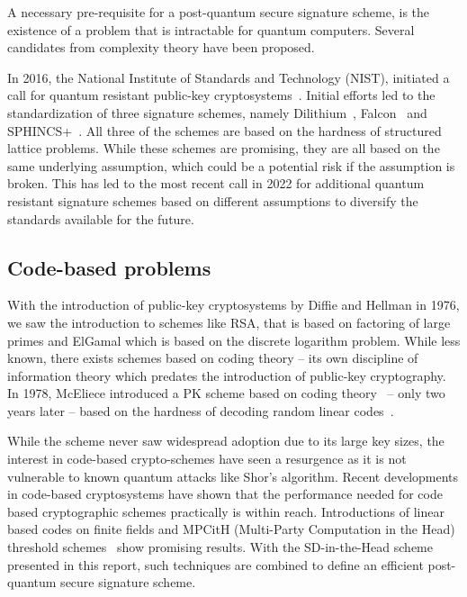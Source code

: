 \documentclass[twoside,11pt]{report}
\theoremstyle{definition}
\theoremstyle{plain}
\begin{document}
A necessary pre-requisite for a post-quantum secure signature scheme, is the existence of a problem that is intractable for quantum computers. Several candidates from complexity theory have been proposed.

In 2016, the National Institute of Standards and Technology (NIST), initiated a call for quantum resistant public-key cryptosystems~\cite{nistcall}. Initial efforts led to the standardization of three signature schemes, namely Dilithium~\cite{ducas2018crystals}, Falcon~\cite{fouque2018falcon} and SPHINCS+~\cite{bernstein2019sphincs+}. All three of the schemes are based on the hardness of structured lattice problems. While these schemes are promising, they are all based on the same underlying assumption, which could be a potential risk if the assumption is broken. This has led to the most recent call in 2022 for additional quantum resistant signature schemes based on different assumptions to diversify the standards available for the future.

\subsection{Code-based problems}

With the introduction of public-key cryptosystems by Diffie and Hellman in 1976, we saw the introduction to schemes like RSA, that is based on factoring of large primes and ElGamal which is based on the discrete logarithm problem. While less known, there exists schemes based on coding theory -- its own discipline of information theory which predates the introduction of public-key cryptography. In 1978, McEliece introduced a PK scheme based on coding theory~\cite{mceliece1978public} -- only two years later -- based on the hardness of decoding random linear codes~\cite{berlekamp1978inherent}.

While the scheme never saw widespread adoption due to its large key sizes, the interest in code-based crypto-schemes have seen a resurgence as it is not vulnerable to known quantum attacks like Shor's algorithm. Recent developments in code-based cryptosystems have shown that the performance needed for code based cryptographic schemes practically is within reach. Introductions of linear based codes on finite fields and MPCitH (Multi-Party Computation in the Head) threshold schemes~\cite{baum2020concretely} show promising results. With the SD-in-the-Head scheme~\cite{aguilarsyndrome11,feneuil2023threshold} presented in this report, such techniques are combined to define an efficient post-quantum secure signature scheme.
\end{document}
